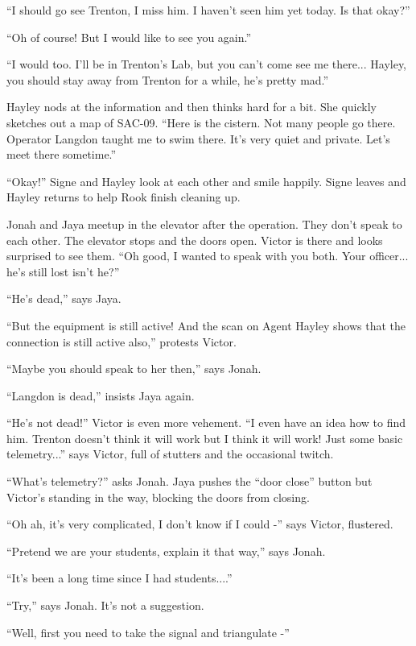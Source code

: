 ``I should go see Trenton, I miss him. I haven't seen him yet today.  Is that okay?''

``Oh of course!  But I would like to see you again.''

``I would too.  I'll be in Trenton's Lab, but you can't come see me there...  Hayley, you should stay away from Trenton for a while, he's pretty mad.''

Hayley nods at the information and then thinks hard for a bit.  She quickly sketches out a map of SAC-09.  ``Here is the cistern.  Not many people go there.  Operator Langdon taught me to swim there.  It's very quiet and private.  Let's meet there sometime.''

``Okay!''  Signe and Hayley look at each other and smile happily.  Signe leaves and Hayley returns to help Rook finish cleaning up.



Jonah and Jaya meetup in the elevator after the operation.  They don't speak to each other.  The elevator stops and the doors open.  Victor is there and looks surprised to see them.  ``Oh good, I wanted to speak with you both.  Your officer... he's still lost isn't he?''

``He's dead,'' says Jaya.

``But the equipment is still active!  And the scan on Agent Hayley shows that the connection is still active also,'' protests Victor.

``Maybe you should speak to her then,'' says Jonah.

``Langdon is dead,'' insists Jaya again.

``He's not dead!''  Victor is even more vehement.  ``I even have an idea how to find him.  Trenton doesn't think it will work but I think it will work!  Just some basic telemetry...'' says Victor, full of stutters and the occasional twitch.

``What's telemetry?'' asks Jonah.  Jaya pushes the ``door close'' button but Victor's standing in the way, blocking the doors from closing.

``Oh ah, it's very complicated, I don't know if I could -'' says Victor, flustered.

``Pretend we are your students, explain it that way,'' says Jonah.

``It's been a long time since I had students....''

``Try,'' says Jonah.  It's not a suggestion.

``Well, first you need to take the signal and triangulate -''

